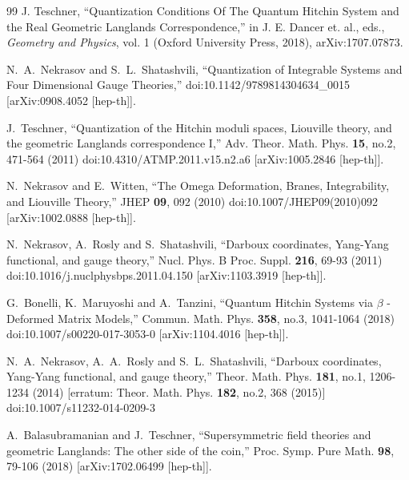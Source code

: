\documentclass[11pt,a4paper]{article}
\begin{document}
\begin{thebibliography}{99}
J. Teschner, ``Quantization Conditions Of The Quantum Hitchin System and the Real Geometric Langlands Correspondence,'' in J. E. Dancer 
et. al., eds., {\it Geometry and Physics}, vol. 1 (Oxford University Press, 2018),
arXiv:1707.07873.



N.~A.~Nekrasov and S.~L.~Shatashvili,
``Quantization of Integrable Systems and Four Dimensional Gauge Theories,''
doi:10.1142/9789814304634\_0015
[arXiv:0908.4052 [hep-th]].

J.~Teschner,
``Quantization of the Hitchin moduli spaces, Liouville theory, and the geometric Langlands correspondence I,''
Adv. Theor. Math. Phys. \textbf{15}, no.2, 471-564 (2011)
doi:10.4310/ATMP.2011.v15.n2.a6
[arXiv:1005.2846 [hep-th]].


N.~Nekrasov and E.~Witten,
``The Omega Deformation, Branes, Integrability, and Liouville Theory,''
JHEP \textbf{09}, 092 (2010)
doi:10.1007/JHEP09(2010)092
[arXiv:1002.0888 [hep-th]].



N.~Nekrasov, A.~Rosly and S.~Shatashvili,
``Darboux coordinates, Yang-Yang functional, and gauge theory,''
Nucl. Phys. B Proc. Suppl. \textbf{216}, 69-93 (2011)
doi:10.1016/j.nuclphysbps.2011.04.150
[arXiv:1103.3919 [hep-th]].


G.~Bonelli, K.~Maruyoshi and A.~Tanzini,
``Quantum Hitchin Systems via ${\beta}$ -Deformed Matrix Models,''
Commun. Math. Phys. \textbf{358}, no.3, 1041-1064 (2018)
doi:10.1007/s00220-017-3053-0
[arXiv:1104.4016 [hep-th]].


N.~A.~Nekrasov, A.~A.~Rosly and S.~L.~Shatashvili,
``Darboux coordinates, Yang-Yang functional, and gauge theory,''
Theor. Math. Phys. \textbf{181}, no.1, 1206-1234 (2014)
[erratum: Theor. Math. Phys. \textbf{182}, no.2, 368 (2015)]
doi:10.1007/s11232-014-0209-3


A.~Balasubramanian and J.~Teschner,
``Supersymmetric field theories and geometric Langlands: The other side of the coin,''
Proc. Symp. Pure Math. \textbf{98}, 79-106 (2018)
[arXiv:1702.06499 [hep-th]].



\end{thebibliography}
\end{document}
